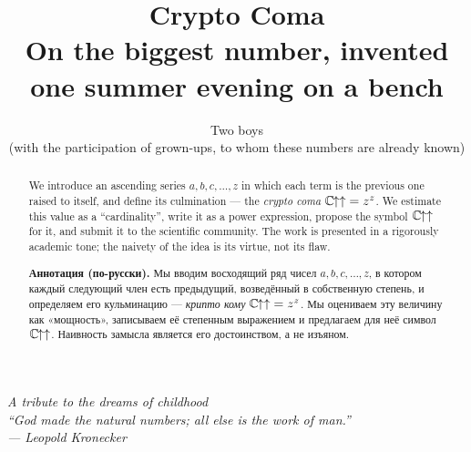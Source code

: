 \documentclass[11pt,a4paper]{article}
\title{\textbf{Crypto Coma}\\[0.3em]
  \large On the biggest number, invented one summer evening on a bench}
\author{Two boys\\ \small (with the participation of grown-ups, to whom these numbers are already known)}
\date{}
\newcommand{\ccoma}{\ensuremath{\mathbb{C}\mkern-1.5mu{\uparrow\uparrow}}}
\begin{document}
\maketitle

\begin{center}\itshape\small
A tribute to the dreams of childhood\\[0.8em]
``God made the natural numbers; all else is the work of man.''\\
\upshape\footnotesize --- Leopold Kronecker
\end{center}
\medskip

\begin{abstract}
\noindent
We introduce an ascending series \(a, b, c, \dots, z\) in which each term is the previous
one raised to itself, and define its culmination --- the \emph{crypto coma}
\(\ccoma = z^{z}\). We estimate this value as a ``cardinality'', write it as a power
expression, propose the symbol \(\ccoma\) for it, and submit it to the scientific community.
The work is presented in a rigorously academic tone; the naivety of the idea is its virtue,
not its flaw.
\end{abstract}

\begin{otherlanguage}{russian}
\begin{abstract}
\noindent
\textbf{Аннотация (по-русски).} Мы вводим восходящий ряд чисел \(a, b, c, \dots, z\), в
котором каждый следующий член есть предыдущий, возведённый в собственную степень, и
определяем его кульминацию --- \emph{крипто кому} \(\ccoma = z^{z}\). Мы оцениваем эту
величину как «мощность», записываем её степенным выражением и предлагаем для неё символ
\(\ccoma\). Наивность замысла является его достоинством, а не изъяном.
\end{abstract}
\end{otherlanguage}










\nocite{*}


\end{document}
